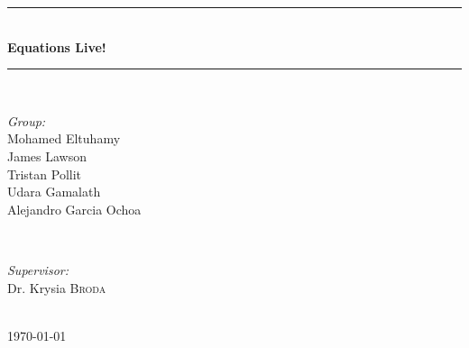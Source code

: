 \documentclass[12pt]{article} %
\begin{document}

\begin{titlepage}

\newcommand{\HRule}{\rule{\linewidth}{0.5mm}} %

\center %

\HRule \\[0.4cm]
{ \huge \bfseries Equations Live!}\\[0.4cm] %
\HRule \\[1.5cm]

\begin{minipage}{0.4\textwidth}
\begin{flushleft} \large
\emph{Group:}\\
Mohamed Eltuhamy\\
James Lawson\\
Tristan Pollit\\
Udara Gamalath\\
Alejandro Garcia Ochoa
\end{flushleft}
\end{minipage}
~
\begin{minipage}{0.4\textwidth}
\begin{flushright} \large
\emph{Supervisor:} \\
Dr. Krysia \textsc{Broda} %
\vspace{3cm}

\end{flushright}
\end{minipage}\\[4cm]

{\large \today}\\[3cm] %


\vfill %

\end{titlepage}

\end{document}

